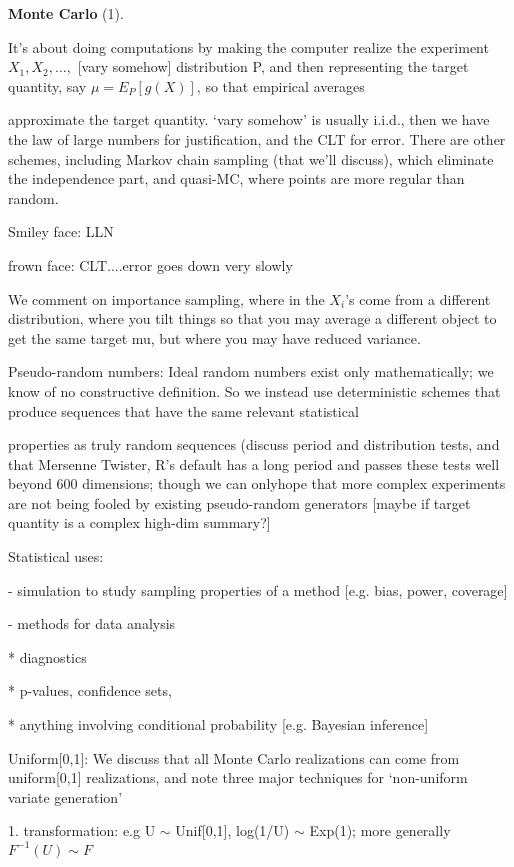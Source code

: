 \documentclass[11pt,a4paper]{article}
\begin{document}
	
\textbf{	Monte Carlo }(1).
	
	It's about doing computations by making the computer realize the experiment $X_1, X_2,...,$ [vary somehow] distribution P, and then representing the target quantity, say $\mu = E_P[ g(X) ]$, so that empirical averages
	
	approximate the target quantity.  `vary somehow' is usually i.i.d., then we have the law of large numbers for justification, and the CLT for error.  There are other schemes, including Markov chain sampling (that we'll discuss), which eliminate the independence part, and quasi-MC, where points are more regular than random.   
	
	Smiley face:  LLN
	
	frown face: CLT....error goes down very slowly
	
	We comment on importance sampling, where in the $X_i$'s come from a different distribution, where you tilt things so that you may average a different object to get the same target mu, but where you may have reduced variance.
	
	Pseudo-random numbers:  Ideal random numbers exist only mathematically; we know of no constructive definition.  So we instead use deterministic schemes that produce sequences that have the same relevant statistical 
	
	properties as truly random sequences (discuss period and distribution tests, and that Mersenne Twister, R's default has a long period and passes these tests well beyond 600 dimensions; though we can onlyhope that more complex experiments are not being fooled by existing pseudo-random generators [maybe if target quantity is a complex high-dim summary?]
	
	Statistical uses:
	
	- simulation to study sampling properties of a method [e.g. bias, power, coverage]
	
	- methods for data analysis
	
	* diagnostics
	
	* p-values, confidence sets, 
	
	* anything involving conditional probability [e.g. Bayesian inference]
	
	Uniform[0,1]:  We discuss that all Monte Carlo realizations can come from uniform[0,1] realizations, and note three major techniques for `non-uniform variate generation'
	
	1. transformation:   e.g U $\sim$ Unif[0,1],  log(1/U) $\sim$ Exp(1); more generally $F^{-1}(U) \sim F$
	
\end{document}

